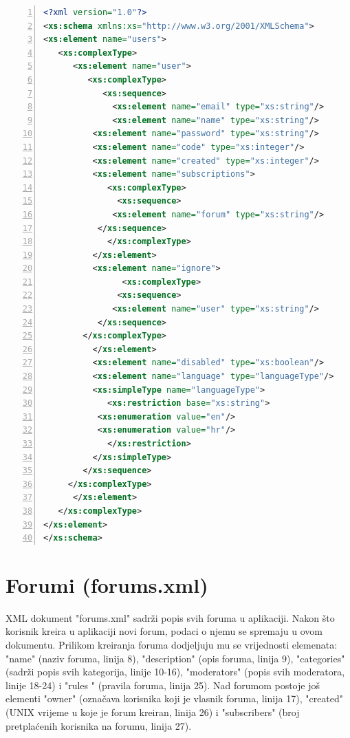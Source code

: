 \documentclass{foi}
\begin{document}
\begin{lstlisting}[language=XML, numbers=left, caption=XML Schema za dokument "users.xml", captionpos=b]
 <?xml version="1.0"?>
<xs:schema xmlns:xs="http://www.w3.org/2001/XMLSchema">
<xs:element name="users">
   <xs:complexType>
      <xs:element name="user">
         <xs:complexType>
            <xs:sequence>
              <xs:element name="email" type="xs:string"/>
              <xs:element name="name" type="xs:string"/>
	      <xs:element name="password" type="xs:string"/>
	      <xs:element name="code" type="xs:integer"/>
	      <xs:element name="created" type="xs:integer"/>
	      <xs:element name="subscriptions">
	         <xs:complexType>
	           <xs:sequence>
		      <xs:element name="forum" type="xs:string"/>
		   </xs:sequence>
	         </xs:complexType>
	      </xs:element>
	      <xs:element name="ignore">
                <xs:complexType>
	           <xs:sequence>
		      <xs:element name="user" type="xs:string"/>
 		   </xs:sequence>
		</xs:complexType>
	      </xs:element>
	      <xs:element name="disabled" type="xs:boolean"/>
	      <xs:element name="language" type="languageType"/>
	      <xs:simpleType name="languageType">
	         <xs:restriction base="xs:string">
		   <xs:enumeration value="en"/>
		   <xs:enumeration value="hr"/>
	         </xs:restriction>
	      </xs:simpleType>
	    </xs:sequence>
	 </xs:complexType>
      </xs:element>
   </xs:complexType>
</xs:element>
</xs:schema> 
\end{lstlisting}

\section{Forumi (forums.xml)}

XML dokument "forums.xml" sadrži popis svih foruma u aplikaciji. Nakon što korisnik kreira u aplikaciji novi forum, podaci o njemu se spremaju u ovom dokumentu. Prilikom kreiranja foruma dodjeljuju mu se vrijednosti elemenata: "name" (naziv foruma, linija 8), "description" (opis foruma, linija 9), "categories" (sadrži popis svih kategorija, linije 10-16), "moderators" (popis svih moderatora, linije 18-24) i "rules " (pravila foruma, linija 25). Nad forumom postoje još elementi "owner" (označava korisnika koji je vlasnik foruma, linija 17), "created" (UNIX vrijeme u koje je forum kreiran, linija 26) i "subscribers" (broj pretplaćenih korisnika na forumu, linija 27).
\end{document}
